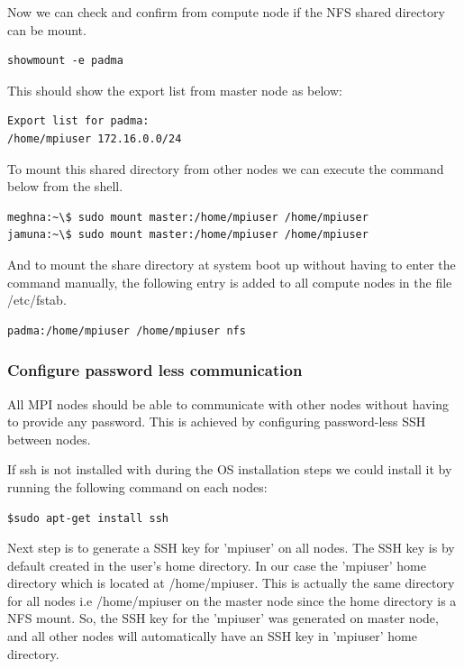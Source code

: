 Now we can check and confirm from compute node if the NFS shared directory can be mount.

\begin{lstlisting}[style=BashInputStyle]
	showmount -e padma
\end{lstlisting}

This should show the export list from master node as below:
\begin{lstlisting}[style=BashInputStyle]
Export list for padma:
/home/mpiuser 172.16.0.0/24
\end{lstlisting}

To mount this shared directory from other nodes we can execute the command below from the shell.

\begin{lstlisting}[style=BashInputStyle]
meghna:~\$ sudo mount master:/home/mpiuser /home/mpiuser
jamuna:~\$ sudo mount master:/home/mpiuser /home/mpiuser
\end{lstlisting}

And to mount the share directory at system boot up without having to enter the command manually, the following entry is added to all compute nodes in the file /etc/fstab.

\begin{lstlisting}[style=BashInputStyle]
	padma:/home/mpiuser /home/mpiuser nfs
\end{lstlisting}

\subsubsection{Configure password less communication}
All MPI nodes should be able to communicate with other nodes without having to provide any password. This is achieved by configuring password-less SSH between nodes.

If ssh is not installed with during the OS installation steps we could install it by running the following command on each nodes:
\begin{lstlisting}[style=BashInputStyle]
	$sudo apt-get install ssh
\end{lstlisting}

Next step is to generate a SSH key for  'mpiuser' on all nodes. The SSH key is by default created in the user's home directory. In our case the 'mpiuser' home directory  which is located at /home/mpiuser. This is actually the same directory for all nodes i.e  /home/mpiuser on the master node since the home directory is a NFS mount. So, the SSH key for the 'mpiuser' was generated on master node, and all other nodes will automatically have an SSH key in 'mpiuser' home directory. 


